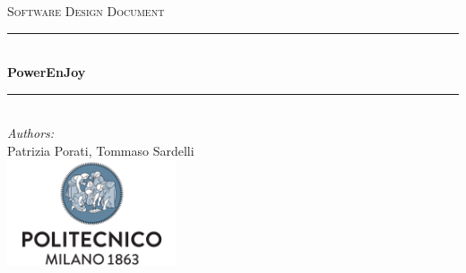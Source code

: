 \documentclass[a4paper,11pt]{article}
\begin{document}
\begin{titlepage}
\begin{center}
\textsc{\LARGE Software Design Document}\\[1.5cm] %

\rule{\linewidth}{0.5mm} \\[0.7cm]
{\huge \bfseries PowerEnJoy}\\[0.4cm] %
\rule{\linewidth}{0.5mm} \\[1.5cm]

\emph{Authors:}\\
Patrizia Porati, Tommaso Sardelli\\[2.0cm]

\vfill
\vfill
\includegraphics[width=50mm]{polimi.png}\\
\end{center}
\end{titlepage}

\tableofcontents
\pagebreak







\end{document}
